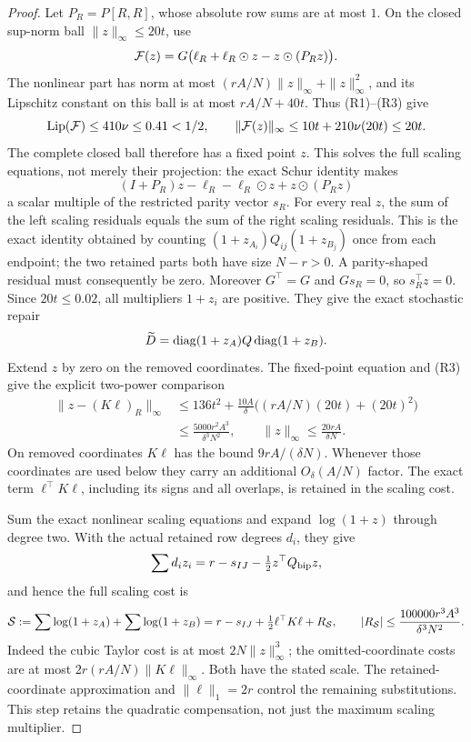 \begin{proof}
Let \(P_R=P[R,R]\), whose absolute row sums are at most \(1\).
On the closed sup-norm ball \(\|z\|_\infty\leq20t\), use
\[
 {\cal F}(z)=G\bigl(\ell_R+\ell_R\odot z-z\odot(P_Rz)\bigr).
\]
The nonlinear part has norm at most
\((rA/N)\|z\|_\infty+\|z\|_\infty^2\), and its Lipschitz
constant on this ball is at most \(rA/N+40t\).
Thus (R1)--(R3) give
\[
 \operatorname{Lip}({\cal F})\leq410\nu\leq0.41<1/2,
 \qquad
 \|{\cal F}(z)\|_\infty
 \leq10t+210\nu(20t)\leq20t.
\]
The complete closed ball therefore has a fixed point \(z\).
This solves the full scaling equations, not merely their
projection: the exact Schur identity makes
\[
 (I+P_R)z-\ell_R-\ell_R\odot z+z\odot(P_Rz)
\]
a scalar multiple of the restricted parity vector \(s_R\).
For every real \(z\), the sum of the left scaling residuals
equals the sum of the right scaling residuals. This is the exact
identity obtained by counting
\((1+z_{A_i})Q_{ij}(1+z_{B_j})\) once from each endpoint;
the two retained parts both have size \(N-r>0\).
A parity-shaped residual must consequently be zero.
Moreover \(G^\top=G\) and \(Gs_R=0\), so \(s_R^\top z=0\).
Since \(20t\leq0.02\), all multipliers \(1+z_i\) are positive.
They give the exact stochastic repair
\[
 \widetilde D=\operatorname{diag}(1+z_A)Q\operatorname{diag}(1+z_B).
\]
Extend \(z\) by zero on the removed coordinates. The fixed-point
equation and (R3) give the explicit two-power comparison
\[
 \begin{split}
 \|z-(K\ell)_R\|_\infty
 &\leq136t^2+\frac{10A}{\delta}
                      \bigl((rA/N)(20t)+(20t)^2\bigr)\\
 &\leq\frac{5000r^2A^3}{\delta^3N^2},\qquad
 \|z\|_\infty\leq\frac{20rA}{\delta N}.
 \end{split}
 \tag{R4}
\]
On removed coordinates \(K\ell\) has the bound \(9rA/(\delta N)\).
Whenever those coordinates are used below they carry an additional
\(O_\delta(A/N)\) factor. The exact term \(\ell^\top K\ell\),
including its signs and all overlaps, is retained in the scaling cost.

Sum the exact nonlinear scaling equations and expand
\(\log(1+z)\) through degree two. With the actual retained
row degrees \(d_i\), they give
\[
 \sum d_i z_i=r-s_{IJ}-\tfrac12z^\top Q_{\rm bip}z,
\]
and hence the full scaling cost is
\[
 {\cal S}:=\sum\log(1+z_A)+\sum\log(1+z_B)
 =r-s_{IJ}+\tfrac12\ell^\top K\ell+R_{\cal S},
 \qquad |R_{\cal S}|
 \leq\frac{100000r^3A^3}{\delta^3N^2}.
\]
Indeed the cubic Taylor cost is at most \(2N\|z\|_\infty^3\);
the omitted-coordinate costs are at most
\(2r(rA/N)\|K\ell\|_\infty\).
Both have the stated scale. The retained-coordinate approximation and
\(\|\ell\|_1=2r\) control the remaining substitutions.
This step retains the quadratic compensation, not just
the maximum scaling multiplier.


\end{proof}
